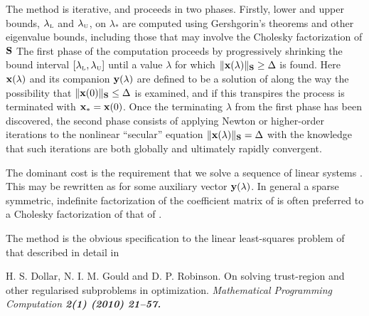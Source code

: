 \documentclass{galahad}
\begin{document}
\noindent 
The method is iterative, and proceeds in two phases.
Firstly, lower and upper bounds, $\lambda_{\mbox{\protect\tiny L}}$ and
$\lambda_{\mbox{\protect\tiny U}}$, on $\lambda_*$ are computed
using Gershgorin's theorems and other eigenvalue bounds,
including those that may involve the Cholesky factorization of ${\mathbf{S}}$  The
first phase of the computation proceeds by progressively shrinking  the bound 
interval $[\lambda_{\mbox{\protect\tiny L}},\lambda_{\mbox{\protect\tiny U}}]$
until a value $\lambda$ for which
$\|{\mathbf{x}}(\lambda)\|_{{\mathbf{S}}}  \geq  \Delta$ is found. 
Here ${\mathbf{x}}(\lambda)$ and its companion ${\mathbf{y}}(\lambda)$
are defined to be a solution of 
along the way the possibility that
$\|{\mathbf{x}}(0)\|_{{\mathbf{S}}}  \leq  \Delta$ is examined, and if this transpires
the process is terminated with ${\mathbf{x}}_* = {\mathbf{x}}(0)$. 
Once the terminating $\lambda$ from the first phase has been discovered,
the second phase
consists of applying Newton or higher-order iterations to the nonlinear
``secular'' equation $\|{\mathbf{x}}(\lambda)\|_{{\mathbf{S}}}  =  \Delta$ with
the knowledge that such iterations are both globally and ultimately 
rapidly convergent. 
 
The dominant cost is the requirement that we solve a sequence of linear systems
. This may be rewritten as
for some auxiliary vector ${\mathbf{y}}(\lambda)$.
In general a sparse symmetric, indefinite factorization of the
coefficient matrix of  is 
often preferred to a Cholesky factorization of that of .

\galreference
The method is the obvious specification to the linear least-squares 
problem of that described in detail in 
\vspace*{1mm}

\noindent  
H. S. Dollar, N. I. M. Gould and D. P. Robinson.
On solving trust-region and other regularised subproblems in optimization.
\em Mathematical Programming Computation \bf 2(1) \rm (2010) 21--57.

\end{document}
